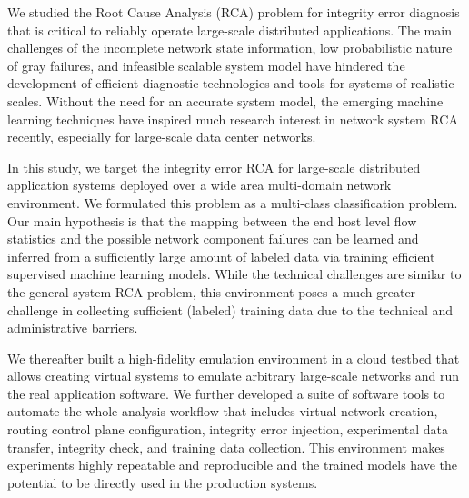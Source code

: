 We studied the Root Cause Analysis (RCA) problem for integrity error diagnosis that is critical to reliably operate large-scale distributed applications. The main challenges of the incomplete network state information, low probabilistic nature of gray failures, and infeasible scalable system model have hindered the development of efficient diagnostic technologies and tools for systems of realistic scales. Without the need for an accurate system model, the emerging machine learning techniques have inspired much research interest in network system RCA recently, especially for large-scale data center networks.

In this study, we target the integrity error RCA for large-scale distributed application systems deployed over a wide area multi-domain network environment. We formulated this problem as a multi-class classification problem. Our main hypothesis is that the mapping between the end host level flow statistics and the possible network component failures can be learned and inferred from a sufficiently large amount of labeled data via training efficient supervised machine learning models. While the technical challenges are similar to the general system RCA problem, this environment poses a much greater challenge in collecting sufficient (labeled) training data due to the technical and administrative barriers.  

We thereafter built a high-fidelity emulation environment in a cloud testbed that allows creating virtual systems to emulate arbitrary large-scale networks and run the real application software. We further developed a suite of software tools to automate the whole analysis workflow that includes virtual network creation, routing control plane configuration, integrity error injection, experimental data transfer, integrity check, and training data collection. This environment makes experiments highly repeatable and reproducible and the trained models have the potential to be directly used in the production systems.   

